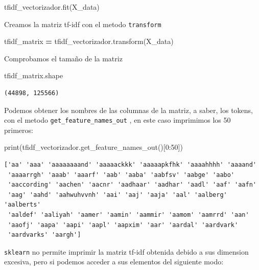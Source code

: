 \documentclass[
  11pt,
  a4paper,
]{article}
\newenvironment{Shaded}{\begin{snugshade}}{\end{snugshade}}
\newcommand{\BuiltInTok}[1]{#1}
\newcommand{\DecValTok}[1]{\textcolor[rgb]{0.00,0.00,0.81}{#1}}
\newcommand{\NormalTok}[1]{#1}
\newcommand{\OperatorTok}[1]{\textcolor[rgb]{0.81,0.36,0.00}{\textbf{#1}}}
\begin{document}
\begin{Shaded}
\begin{Highlighting}[]
\NormalTok{tfidf\_vectorizador.fit(X\_data)}
\end{Highlighting}
\end{Shaded}

Creamos la matriz tf-idf con el metodo \texttt{transform}

\begin{Shaded}
\begin{Highlighting}[]
\NormalTok{tfidf\_matrix }\OperatorTok{=}\NormalTok{ tfidf\_vectorizador.transform(X\_data)}
\end{Highlighting}
\end{Shaded}

Comprobamos el tamaño de la matriz

\begin{Shaded}
\begin{Highlighting}[]
\NormalTok{tfidf\_matrix.shape}
\end{Highlighting}
\end{Shaded}

\begin{verbatim}
(44898, 125566)
\end{verbatim}

Podemos obtener los nombres de las columnas de la matriz, a saber, los
tokens, con el metodo \texttt{get\_feature\_names\_out} , en este caso
imprimimos los 50 primeros:

\begin{Shaded}
\begin{Highlighting}[]
\BuiltInTok{print}\NormalTok{(tfidf\_vectorizador.get\_feature\_names\_out()[}\DecValTok{0}\NormalTok{:}\DecValTok{50}\NormalTok{])}
\end{Highlighting}
\end{Shaded}

\begin{verbatim}
['aa' 'aaa' 'aaaaaaaand' 'aaaaackkk' 'aaaaapkfhk' 'aaaahhhh' 'aaaand'
 'aaaarrgh' 'aaab' 'aaarf' 'aab' 'aaba' 'aabfsv' 'aabge' 'aabo'
 'aaccording' 'aachen' 'aacnr' 'aadhaar' 'aadhar' 'aadl' 'aaf' 'aafn'
 'aag' 'aahd' 'aahwuhvvnh' 'aai' 'aaj' 'aaja' 'aal' 'aalberg' 'aalberts'
 'aaldef' 'aaliyah' 'aamer' 'aamin' 'aammir' 'aamom' 'aamrrd' 'aan'
 'aaofj' 'aapa' 'aapi' 'aapl' 'aapxim' 'aar' 'aardal' 'aardvark'
 'aardvarks' 'aargh'] 
\end{verbatim}

\texttt{sklearn} no permite imprimir la matriz tf-idf obtenida debido a
sus dimension excesiva, pero si podemos acceder a sus elementos del
siguiente modo:
\end{document}
